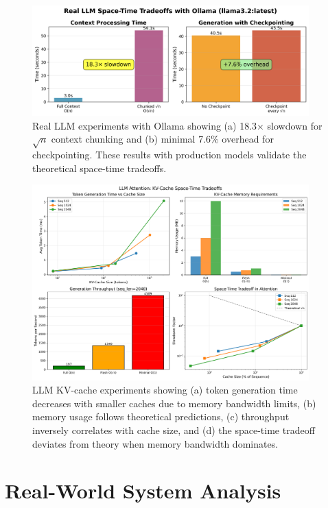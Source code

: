 \documentclass[11pt]{article}
\theoremstyle{definition}
\begin{document}
\begin{figure}[htbp]
\centering
\includegraphics[width=0.95\textwidth]{figures/ollama_spacetime_results.png}
\caption{Real LLM experiments with Ollama showing (a) 18.3× slowdown for $\sqrt{n}$ context chunking and (b) minimal 7.6\% overhead for checkpointing. These results with production models validate the theoretical space-time tradeoffs.}
\label{fig:ollama_results}
\end{figure}

\begin{figure}[htbp]
\centering
\includegraphics[width=0.95\textwidth]{figures/llm_attention_tradeoff.png}
\caption{LLM KV-cache experiments showing (a) token generation time decreases with smaller caches due to memory bandwidth limits, (b) memory usage follows theoretical predictions, (c) throughput inversely correlates with cache size, and (d) the space-time tradeoff deviates from theory when memory bandwidth dominates.}
\label{fig:llm_tradeoff}
\end{figure}

\section{Real-World System Analysis}
\label{sec:systems}
\end{document}
